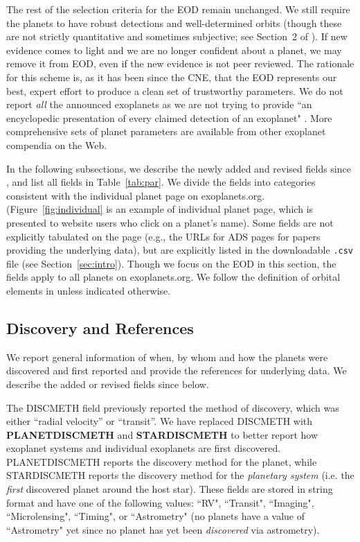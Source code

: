 \documentclass[11pt,preprint]{aastex}
\begin{document}
\begin{CJK*}{UTF8}{gbsn}
The rest of the selection criteria for the EOD remain unchanged. We
still require the planets to have robust detections and well-determined
orbits (though these are not strictly quantitative and sometimes subjective; see Section~2 of
\citealt{Wright2011}). If new evidence comes to light and we are no
longer confident about a planet, we may remove it from EOD, even if the
new evidence is not peer reviewed.  The rationale for this scheme is,
as it has been since the CNE, that the EOD represents our best, expert effort to produce a clean set of
trustworthy parameters.  We do not report \textit{all} the announced
exoplanets as we are not trying to provide ``an encyclopedic
presentation of every claimed detection of an 
exoplanet" \citep{Wright2011}.  More comprehensive sets of planet parameters
are available from other exoplanet compendia on the Web.

In the following subsections, we describe the newly added and revised
fields since \cite{Wright2011}, and list all fields in
Table~\ref{tab:par}. We divide the fields into categories consistent with the individual planet page on
exoplanets.org. (Figure~\ref{fig:individual} is an example of
individual planet page, which is presented to website users who click on a planet's name). Some fields are not explicitly tabulated on
the page (e.g., the URLs for ADS pages for papers providing the underlying data), but are explicitly listed in the
downloadable {\tt .csv} file (see Section~\ref{sec:intro}). Though we
focus on the EOD in this section, the fields apply to all planets on
exoplanets.org. We follow the definition of orbital elements in
\cite{Wright2013} unless indicated otherwise.


\subsection{Discovery and References}\label{sec:disc}

We report general information of when, by whom and how the planets
were discovered and first reported and provide the references for underlying data. We describe the added or
revised fields since \cite{Wright2011} below.

The DISCMETH field previously reported the method of discovery,
which was either ``radial velocity'' or ``transit''. We have replaced DISCMETH
with {\bf PLANETDISCMETH} and {\bf STARDISCMETH} to better
report how exoplanet systems and individual exoplanets are first
discovered. PLANETDISCMETH reports the discovery method for the
planet, while STARDISCMETH reports the discovery method for the {\it
  planetary system} (i.e. the {\it first}
discovered planet around the host star). These fields are stored
in string format and have one of the following values: ``RV",
``Transit", ``Imaging", ``Microlensing", ``Timing", or ``Astrometry"
(no planets have a value of ``Astrometry" yet since no planet has yet
been {\it discovered} via astrometry).


\end{CJK*}
\end{document}
